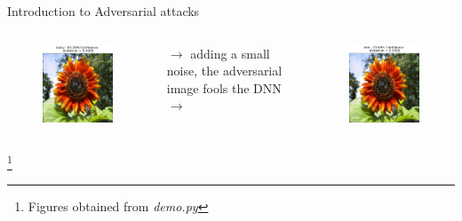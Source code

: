 \documentclass{beamer}
\theoremstyle{plain}
\theoremstyle{definition}
\newcommand\blfootnote[1]{%
  \begingroup
  \renewcommand\thefootnote{}\footnote{#1}%
  \addtocounter{footnote}{-1}%
  \endgroup
}
\begin{document}
\begin{frame}{Introduction to Adversarial attacks}
\begin{columns}
\begin{column}{0.4\textwidth}
\begin{figure}[ht]
  \centering
  \includegraphics[width=0.7\columnwidth]{Images/original.png}\\
\end{figure}
\end{column}
\begin{column}{0.2\textwidth}
$\to$ adding a small noise, the adversarial image fools the DNN $\to$
\end{column}
\begin{column}{0.4\textwidth}
\begin{figure}[ht]
  \centering
  \includegraphics[width=0.7\columnwidth]{Images/fw_untargeted.png}\\
\end{figure}
\end{column}
\end{columns}

\blfootnote{Figures obtained from \textit{demo.py}}

\end{frame}
\end{document}
